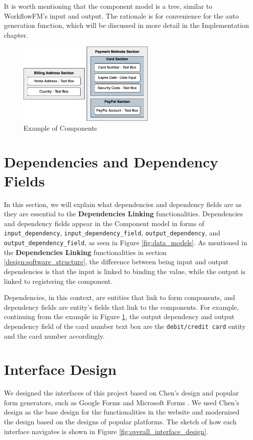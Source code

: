 It is worth mentioning that the component model is a tree, similar to WorkflowFM's input and output. The rationale is for convenience for the auto generation function, which will be discussed in more detail in the Implementation chapter.

\begin{figure}[ht!]
    \centering
    \includegraphics[width=0.6\textwidth]{overleaf/images/component_example.png}
    \caption{Example of Components}
    \label{fig:component_example}
\end{figure}

\section{Dependencies and Dependency Fields}
\label{dependencies}
In this section, we will explain what dependencies and dependency fields are as they are essential to the \textbf{Dependencies Linking} functionalities. Dependencies and dependency fields appear in the Component model in forms of \verb!input_dependency!, \verb!input_dependency_field!, \verb!output_dependency!, and \verb!output_dependency_field!, as seen in Figure \ref{fig:data_models}.
As mentioned in the \textbf{Dependencies Linking} functionalities in section \ref{design:software_structure}, the difference between being input and output dependencies is that the input is linked to binding the value, while the output is linked to registering the component.

Dependencies, in this context, are entities that link to form components, and dependency fields are entity's fields that link to the components. For example, continuing from the example in Figure \ref{fig:component_example}, the output dependency and output dependency field of the card number text box are the \verb!debit/credit card! entity and the card number accordingly.




\section{Interface Design}
\label{interface_design}
We designed the interfaces of this project based on Chen's design \cite{checklistdesign} and popular form generators, such as Google Forms \cite{googleforms} and Microsoft Forms \cite{msforms}. We used Chen's design as the base design for the functionalities in the website and modernised the design based on the designs of popular platforms. The sketch of how each interface navigates is shown in Figure \ref{fig:overall_interface_design}.

